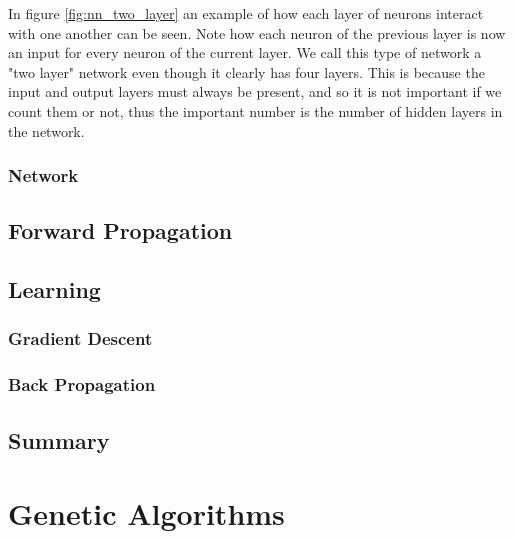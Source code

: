 \documentclass[10pt]{amsart}
\newenvironment{Figure}
{\par\medskip\noindent\minipage{\linewidth}}
{\endminipage\par\medskip}
\begin{document}
\begin{multicols}{2}
  \begin{Figure}
  \begin{center}
    
  \end{center}
  \label{fig:nn_two_layer}
  \end{Figure}

  In figure \ref{fig:nn_two_layer} an example of how each layer of neurons
  interact with one another can be seen. Note how each neuron of the previous
  layer is now an input for every neuron of the current layer. We call this
  type of network a "two layer" network even though it clearly has four layers.
  This is because the input and output layers must always be present, and so it
  is not important if we count them or not, thus the important number is the
  number of hidden layers in the network.

  \subsubsection{Network}%
  \label{ssub:network}

  \subsection{Forward Propagation}%
  \label{sub:forward_propagation}

  \subsection{Learning}%
  \label{sub:learning}

  \subsubsection{Gradient Descent}%
  \label{ssub:gradient_descent}

  \subsubsection{Back Propagation}%
  \label{ssub:back_propagation}

  \subsection{Summary}%
  \label{sub:summary}

  \section{Genetic Algorithms}%
  \label{sec:genetic_algorithms}


\end{multicols}
\end{document}
